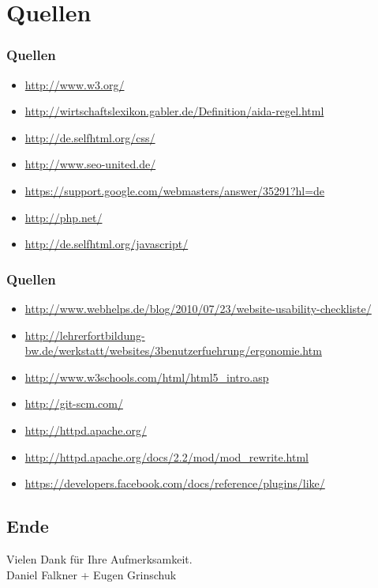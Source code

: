 \documentclass[xcolor=dvipsnames]{beamer}
\newcommand*{\Author}{Daniel Falkner + Eugen Grinschuk} %
\begin{document}
\section*{Quellen}
\begin{frame} %
  \frametitle{Quellen} %
 	\begin{itemize}
		\item \url{http://www.w3.org/}
		\item \url{http://wirtschaftslexikon.gabler.de/Definition/aida-regel.html}
		\item \url{http://de.selfhtml.org/css/}
		\item \url{http://www.seo-united.de/}
		\item \url{https://support.google.com/webmasters/answer/35291?hl=de}		\item \url{http://php.net/}
 		\item \url{http://de.selfhtml.org/javascript/}

	\end{itemize}
\end{frame}

\begin{frame} %
  \frametitle{Quellen} %
 	\begin{itemize}
 		\item  \url{http://www.webhelps.de/blog/2010/07/23/website-usability-checkliste/}
		\item \url{http://lehrerfortbildung-bw.de/werkstatt/websites/3benutzerfuehrung/ergonomie.htm}
		\item \url{ http://www.w3schools.com/html/html5_intro.asp}
		\item \url{http://git-scm.com/}
		\item \url{http://httpd.apache.org/}
		\item \url{http://httpd.apache.org/docs/2.2/mod/mod_rewrite.html}
		\item \url{https://developers.facebook.com/docs/reference/plugins/like/}
	\end{itemize}
\end{frame}

\subsection*{Ende}
\begin{frame}
	\begin{block}{}	
		\begin{center}
			Vielen Dank für Ihre Aufmerksamkeit. \\
			\Author{}
		\end{center}	
	\end{block}
\end{frame}
\end{document}
